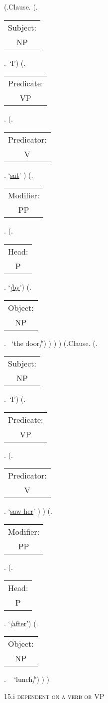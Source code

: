 \documentclass[12pt,letterpaper]{article}
\begin{document}
\begin{figure}
	\begin{center}
		\begin{parsetree}
			(.Clause.
			(.\begin{tabular}{c}Subject:\\NP\end{tabular}.~`I')
			(.\begin{tabular}{c}Predicate:\\VP\end{tabular}.
			(.\begin{tabular}{c}Predicator:\\V\end{tabular}. `\underline{\underline{sat}}' )
			(.\begin{tabular}{c}Modifier:\\PP\end{tabular}. 
			(.\begin{tabular}{c}Head:\\P\end{tabular}.  `\emph{[}\underline{by}')
			(.\begin{tabular}{c}Object:\\NP\end{tabular}. ~`the door\emph{]}')
			)
			)
			)
			(.Clause.
			(.\begin{tabular}{c}Subject:\\NP\end{tabular}.~`I')
			(.\begin{tabular}{c}Predicate:\\VP\end{tabular}.
			(.\begin{tabular}{c}Predicator:\\V\end{tabular}. `\underline{\underline{saw her}}' )
			)
			(.\begin{tabular}{c}Modifier:\\PP\end{tabular}. 
			(.\begin{tabular}{c}Head:\\P\end{tabular}.  `\emph{[}\underline{after}')
			(.\begin{tabular}{c}Object:\\NP\end{tabular}. ~ `lunch\emph{]}')
			)
			)
		
		\hfill \break\hfill \break
		\end{parsetree}
		15.i \textsc{dependent on a verb or VP}
	\end{center}
\end{figure}
\end{document}
